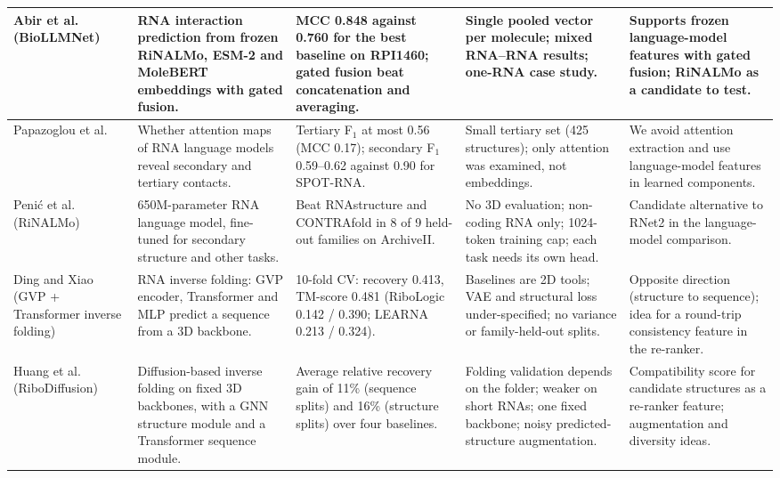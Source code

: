 \documentclass{FastFyp}
\begin{document}
{\begin{longtable}{|p{}|p{}|p{}|p{}|p{}|}
Abir et al.~\cite{abir2025biollmnet} (BioLLMNet) &
RNA interaction prediction from frozen RiNALMo, ESM-2 and MoleBERT embeddings with gated fusion. &
MCC 0.848 against 0.760 for the best baseline on RPI1460; gated fusion beat concatenation and averaging. &
Single pooled vector per molecule; mixed RNA--RNA results; one-RNA case study. &
Supports frozen language-model features with gated fusion; RiNALMo as a candidate to test.\\ \hline

Papazoglou et al.~\cite{ref:Papazoglou:2025} &
Whether attention maps of RNA language models reveal secondary and tertiary contacts. &
Tertiary F$_1$ at most 0.56 (MCC 0.17); secondary F$_1$ 0.59--0.62 against 0.90 for SPOT-RNA. &
Small tertiary set (425 structures); only attention was examined, not embeddings. &
We avoid attention extraction and use language-model features in learned components.\\ \hline

Peni\'{c} et al.~\cite{ref:Penic:2024} (RiNALMo) &
650M-parameter RNA language model, fine-tuned for secondary structure and other tasks. &
Beat RNAstructure and CONTRAfold in 8 of 9 held-out families on ArchiveII. &
No 3D evaluation; non-coding RNA only; 1024-token training cap; each task needs its own head. &
Candidate alternative to RNet2 in the language-model comparison.\\ \hline

Ding and Xiao~\cite{ding2025inverse} (GVP + Transformer inverse folding) &
RNA inverse folding: GVP encoder, Transformer and MLP predict a sequence from a 3D backbone. &
10-fold CV: recovery 0.413, TM-score 0.481 (RiboLogic 0.142 / 0.390; LEARNA 0.213 / 0.324). &
Baselines are 2D tools; VAE and structural loss under-specified; no variance or family-held-out splits. &
Opposite direction (structure to sequence); idea for a round-trip consistency feature in the re-ranker.\\ \hline

Huang et al.~\cite{huang2024ribodiffusion} (RiboDiffusion) &
Diffusion-based inverse folding on fixed 3D backbones, with a GNN structure module and a Transformer sequence module. &
Average relative recovery gain of 11\% (sequence splits) and 16\% (structure splits) over four baselines. &
Folding validation depends on the folder; weaker on short RNAs; one fixed backbone; noisy predicted-structure augmentation. &
Compatibility score for candidate structures as a re-ranker feature; augmentation and diversity ideas.\\ \hline


\end{longtable}}
\end{document}

